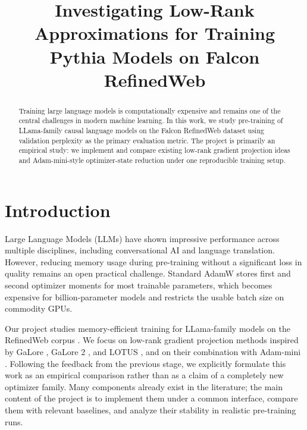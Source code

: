 \documentclass[conference]{IEEEtran}
\begin{document}
\title{Investigating Low-Rank Approximations for Training Pythia Models on Falcon RefinedWeb}

\author{
\and
{}
\and
{}
}

\maketitle

\begin{abstract}
Training large language models is computationally expensive and remains one of the central challenges in modern machine learning. In this work, we study pre-training of LLama-family causal language models on the Falcon RefinedWeb dataset using validation perplexity as the primary evaluation metric. The project is primarily an empirical study: we implement and compare existing low-rank gradient projection ideas and Adam-mini-style optimizer-state reduction under one reproducible training setup.
\end{abstract}

\section{Introduction}

Large Language Models (LLMs) have shown impressive performance across multiple disciplines, including conversational AI and language translation. However, reducing memory usage during pre-training without a significant loss in quality remains an open practical challenge. Standard AdamW stores first and second optimizer moments for most trainable parameters, which becomes expensive for billion-parameter models and restricts the usable batch size on commodity GPUs.

Our project studies memory-efficient training for LLama-family models \cite{touvron2023llamaopenefficientfoundation} on the RefinedWeb corpus \cite{penedo2023refinedwebdatasetfalconllm}. We focus on low-rank gradient projection methods inspired by GaLore \cite{Galore}, GaLore 2 \cite{su2025galore2largescalellm}, and LOTUS \cite{miao2026lotusefficientllmtraining}, and on their combination with Adam-mini \cite{zhang2025adamminiusefewerlearning}. Following the feedback from the previous stage, we explicitly formulate this work as an empirical comparison rather than as a claim of a completely new optimizer family. Many components already exist in the literature; the main content of the project is to implement them under a common interface, compare them with relevant baselines, and analyze their stability in realistic pre-training runs.
\end{document}
